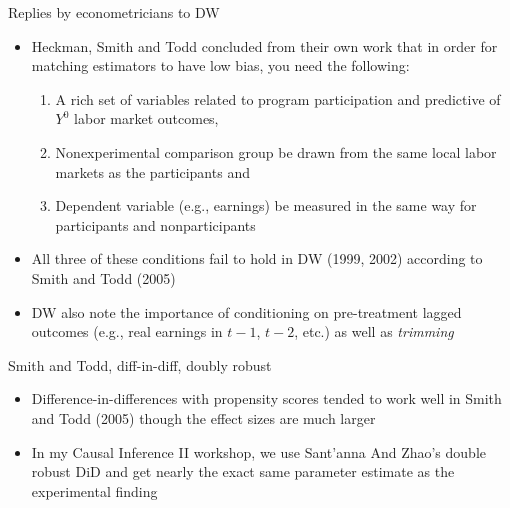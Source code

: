 \documentclass{beamer}
\begin{document}





\clearpage
\newpage

\begin{frame}{Replies by econometricians to DW}

\begin{itemize}
\item Heckman, Smith and Todd concluded from their own work that in order for matching estimators to have low bias, you need the following:
	\begin{enumerate}
	\item A rich set of variables related to program participation and predictive of $Y^0$ labor market outcomes, 
	\item Nonexperimental comparison group be drawn from the same local labor markets as the participants and 
	\item Dependent variable (e.g., earnings) be measured in the same way for participants and nonparticipants
	\end{enumerate}
\item All three of these conditions fail to hold in DW (1999, 2002) according to Smith and Todd (2005)
\item DW also note the importance of conditioning on pre-treatment lagged outcomes (e.g., real earnings in $t-1$, $t-2$, etc.) as well as \emph{trimming}
\end{itemize}

\end{frame}


\begin{frame}{Smith and Todd, diff-in-diff, doubly robust}

\begin{itemize}
\item Difference-in-differences with propensity scores tended to work well in Smith and Todd (2005) though the effect sizes are much larger
\item In my Causal Inference II workshop, we use Sant'anna And Zhao's double robust DiD and get nearly the exact same parameter estimate as the experimental finding

\end{itemize}

\end{frame}
\end{document}
